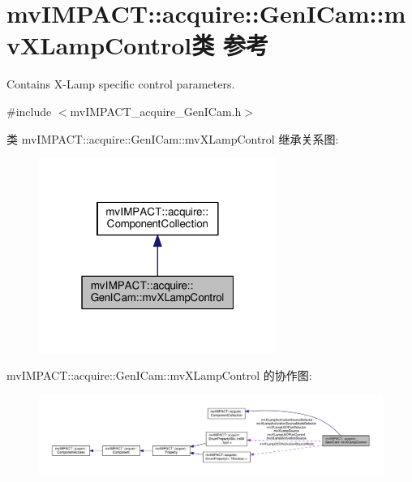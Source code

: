 \hypertarget{classmv_i_m_p_a_c_t_1_1acquire_1_1_gen_i_cam_1_1mv_x_lamp_control}{\section{mv\+I\+M\+P\+A\+C\+T\+:\+:acquire\+:\+:Gen\+I\+Cam\+:\+:mv\+X\+Lamp\+Control类 参考}
\label{classmv_i_m_p_a_c_t_1_1acquire_1_1_gen_i_cam_1_1mv_x_lamp_control}
}


Contains X-\/\+Lamp specific control parameters.  




{\ttfamily \#include $<$mv\+I\+M\+P\+A\+C\+T\+\_\+acquire\+\_\+\+Gen\+I\+Cam.\+h$>$}



类 mv\+I\+M\+P\+A\+C\+T\+:\+:acquire\+:\+:Gen\+I\+Cam\+:\+:mv\+X\+Lamp\+Control 继承关系图\+:
\nopagebreak
\begin{figure}[H]
\begin{center}
\leavevmode
\includegraphics[width=220pt]{classmv_i_m_p_a_c_t_1_1acquire_1_1_gen_i_cam_1_1mv_x_lamp_control__inherit__graph}
\end{center}
\end{figure}


mv\+I\+M\+P\+A\+C\+T\+:\+:acquire\+:\+:Gen\+I\+Cam\+:\+:mv\+X\+Lamp\+Control 的协作图\+:
\nopagebreak
\begin{figure}[H]
\begin{center}
\leavevmode
\includegraphics[width=350pt]{classmv_i_m_p_a_c_t_1_1acquire_1_1_gen_i_cam_1_1mv_x_lamp_control__coll__graph}
\end{center}
\end{figure}
